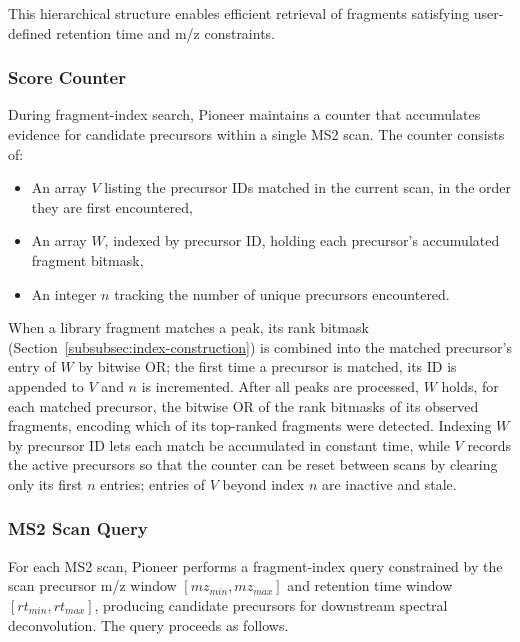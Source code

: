 \documentclass[pdflatex,sn-nature]{sn-jnl}
\begin{document}
This hierarchical structure enables efficient retrieval of fragments satisfying user-defined retention time and m/z constraints.

\subsubsection{Score Counter}\label{subsubsec:score-counter}

During fragment-index search, Pioneer maintains a counter that accumulates evidence for candidate precursors within a single MS2 scan. The counter consists of:

\begin{itemize}
    \item An array $V$ listing the precursor IDs matched in the current scan, in the order they are first encountered,
    \item An array $W$, indexed by precursor ID, holding each precursor's accumulated fragment bitmask,
    \item An integer $n$ tracking the number of unique precursors encountered.
\end{itemize}

When a library fragment matches a peak, its rank bitmask (Section~\ref{subsubsec:index-construction}) is combined into the matched precursor's entry of $W$ by bitwise OR; the first time a precursor is matched, its ID is appended to $V$ and $n$ is incremented. After all peaks are processed, $W$ holds, for each matched precursor, the bitwise OR of the rank bitmasks of its observed fragments, encoding which of its top-ranked fragments were detected. Indexing $W$ by precursor ID lets each match be accumulated in constant time, while $V$ records the active precursors so that the counter can be reset between scans by clearing only its first $n$ entries; entries of $V$ beyond index $n$ are inactive and stale.

\subsubsection{MS2 Scan Query}\label{subsubsec:msms-scan-query}

For each MS2 scan, Pioneer performs a fragment-index query constrained by the scan precursor m/z window $[mz_{min}, mz_{max}]$ and retention time window $[rt_{min}, rt_{max}]$, producing candidate precursors for downstream spectral deconvolution. The query proceeds as follows.
\end{document}
